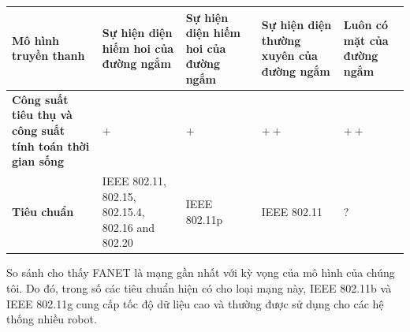 \documentclass[11pt,openany]{book}
\begin{document}
\begin{table}[H]
\begin{tabular}{|p{2.8cm}|p{1.5cm}|p{1.5cm}|p{1.8cm}|p{1.8cm}|}
        \textbf{Mô hình truyền thanh}                                     & Sự hiện diện hiếm hoi của đường ngắm                & Sự hiện diện hiếm hoi của đường ngắm & Sự hiện diện thường xuyên của đường ngắm                                                       & Luôn có mặt của đường ngắm          \\\hline
        \textbf{Công suất tiêu thụ và công suất tính toán thời gian sống} & $+$                                                 & $+$                                  & $++$                                                                                           & $++$                                \\\hline
        \textbf{Tiêu chuẩn}                                               & IEEE 802.11, 802.15, 802.15.4, 802.16 and 802.20    & IEEE 802.11p                         & IEEE 802.11                                                                                    & ?                                   \\\hline
    \end{tabular}
\end{table}
So sánh cho thấy FANET là mạng gần nhất với kỳ vọng của mô hình của chúng tôi. Do đó, trong số các tiêu chuẩn hiện có cho loại mạng này, IEEE 802.11b và IEEE 802.11g cung cấp tốc độ dữ liệu cao và thường được sử dụng cho các hệ thống nhiều robot.
\end{document}
